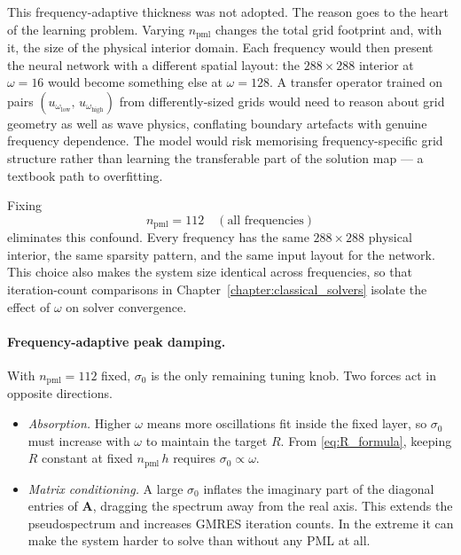 This frequency-adaptive thickness was not adopted. The reason
goes to the heart of the learning problem. Varying
$n_{\mathrm{pml}}$ changes the total grid footprint and, with
it, the size of the physical interior domain. Each frequency
would then present the neural network with a different spatial
layout: the $288 \times 288$ interior at $\omega = 16$ would
become something else at $\omega = 128$. A transfer operator
trained on pairs $(u_{\omega_{\mathrm{low}}},\,u_{\omega_{\mathrm{high}}})$
from differently-sized grids would need to reason about
grid geometry as well as wave physics, conflating boundary
artefacts with genuine frequency dependence. The model would
risk memorising frequency-specific grid structure rather than
learning the transferable part of the solution map --- a
textbook path to overfitting.

Fixing
\begin{equation}
    n_{\mathrm{pml}} = 112 \quad (\text{all frequencies})
    \label{eq:fixed_npml}
\end{equation}
eliminates this confound. Every frequency has the same
$288 \times 288$ physical interior, the same sparsity pattern,
and the same input layout for the network. This choice also
makes the system size identical across frequencies, so that
iteration-count comparisons in
Chapter~\ref{chapter:classical_solvers} isolate the effect of
$\omega$ on solver convergence.

\paragraph{Frequency-adaptive peak damping.}
With $n_{\mathrm{pml}} = 112$ fixed, $\sigma_0$ is the only
remaining tuning knob. Two forces act in opposite directions.

\begin{itemize}
    \item \textit{Absorption.} Higher $\omega$ means more
    oscillations fit inside the fixed layer, so $\sigma_0$
    must increase with $\omega$ to maintain the target $R$.
    From \eqref{eq:R_formula}, keeping $R$ constant at fixed
    $n_{\mathrm{pml}}\,h$ requires $\sigma_0 \propto \omega$.

    \item \textit{Matrix conditioning.} A large $\sigma_0$
    inflates the imaginary part of the diagonal entries of
    $\mathbf{A}$, dragging the spectrum away from the real
    axis. This extends the pseudospectrum and increases GMRES
    iteration counts. In the extreme it can make the system
    harder to solve than without any PML at all.
\end{itemize}

